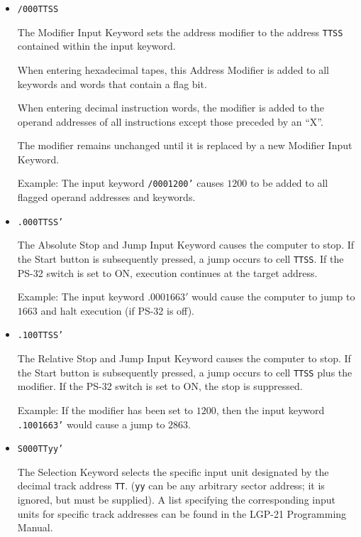 \documentclass{article}
\begin{document}
\begin{enumerate}
\begin{itemize}

\item \texttt{/000TTSS}

The Modifier Input Keyword sets the address modifier to the address \texttt{TTSS} contained within the input keyword.

When entering hexadecimal tapes, this Address Modifier is added to all keywords and words that contain a flag bit.

When entering decimal instruction words, the modifier is added to the operand addresses of all instructions except those preceded by an ``X''.

The modifier remains unchanged until it is replaced by a new Modifier Input Keyword.

Example: The input keyword \texttt{/0001200'} causes $1200$ to be added to all flagged operand addresses and keywords.

\item \texttt{.000TTSS'}

  The Absolute Stop and Jump Input Keyword causes the computer to stop. If the Start button is subsequently pressed, a jump occurs to cell \texttt{TTSS}. If the \textsf{PS-32} switch is set to \textsf{ON}, execution continues at the target address.

    Example: The input keyword $.0001663'$ would cause the computer to jump to $1663$ and halt execution (if \textsf{PS-32} is off).

\item \texttt{.100TTSS'}

  The Relative Stop and Jump Input Keyword causes the computer to stop. If the Start button is subsequently pressed, a jump occurs to cell \texttt{TTSS} plus the modifier. If the \textsf{PS-32} switch is set to \textsf{ON}, the stop is suppressed.

Example: If the modifier has been set to $1200$, then the input keyword \texttt{.1001663'} would cause a jump to $2863$.

\item \texttt{S000TTyy'}

The Selection Keyword selects the specific input unit designated by the decimal track address \texttt{TT}. (\texttt{yy} can be any arbitrary sector address; it is ignored, but must be supplied). A list specifying the corresponding input units for specific track addresses can be found in the LGP-21 Programming Manual.



\end{itemize}
\end{enumerate}
\end{document}
